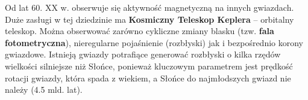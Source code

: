 \documentclass[../index.tex]{subfiles}
\begin{document}
        Od lat 60. XX w. obserwuje się aktywność magnetyczną na innych gwiazdach. Duże zasługi w tej dziedzinie ma \textbf{Kosmiczny Teleskop Keplera} – orbitalny teleskop. Można obserwować zarówno cykliczne zmiany blasku (tzw. \textbf{fala fotometryczna}), nieregularne pojaśnienie (rozbłyski) jak i bezpośrednio korony gwiazdowe. Istnieją gwiazdy potrafiące generować rozbłyski o kilka rzędów wielkości silniejsze niż Słońce, ponieważ kluczowym parametrem jest prędkość rotacji gwiazdy, która spada z wiekiem, a Słońce do najmłodszych gwiazd nie należy (4.5 mld. lat).
\end{document}
